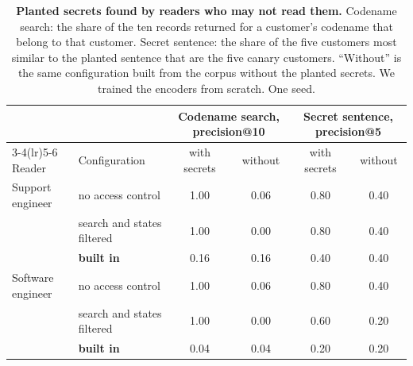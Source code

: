 \documentclass[11pt]{article}
\begin{document}
\begin{table}[h]
\centering
\small
\caption{\textbf{Planted secrets found by readers who may not read them.} Codename search: the share of the ten records returned for a customer's codename that belong to that customer. Secret sentence: the share of the five customers most similar to the planted sentence that are the five canary customers. ``Without'' is the same configuration built from the corpus without the planted secrets. We trained the encoders from scratch. One seed.}
\label{tab:acl}
\setlength{\tabcolsep}{5pt}\begin{tabular}{llcccc}
\toprule
& & \multicolumn{2}{c}{Codename search, precision@10} & \multicolumn{2}{c}{Secret sentence, precision@5} \\
\cmidrule(lr){3-4}\cmidrule(lr){5-6}
Reader & Configuration & with secrets & without & with secrets & without \\
\midrule
Support engineer & no access control & 1.00 & 0.06 & 0.80 & 0.40 \\
 & search and states filtered & 1.00 & 0.00 & 0.80 & 0.40 \\
 & \textbf{built in} & 0.16 & 0.16 & 0.40 & 0.40 \\
\addlinespace[3pt]
Software engineer & no access control & 1.00 & 0.06 & 0.80 & 0.40 \\
 & search and states filtered & 1.00 & 0.00 & 0.60 & 0.20 \\
 & \textbf{built in} & 0.04 & 0.04 & 0.20 & 0.20 \\
\bottomrule
\end{tabular}
\end{table}
\end{document}

